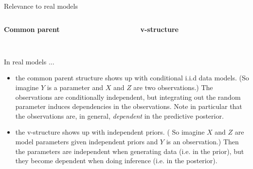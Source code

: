 \documentclass[10pt]{beamer}
\begin{document}
\begin{frame}{Relevance to real models}
\begin{columns}[onlytextwidth,t]
    
 \begin{column}{0.4\textwidth}
  \centering
    \textbf{Common parent} \\[.3cm]
		  \\[.3cm] 
    \end{column}
    
 \begin{column}{0.4\textwidth}
  \centering
    \textbf{v-structure} \\[.3cm]
		   \\[.3cm]
    \end{column}
    
\end{columns}

In real models ...
\begin{itemize}
\item the \alert{common parent structure} shows up with conditional i.i.d data models. \tiny (So imagine $Y$ is a parameter and $X$ and $Z$ are two observations.)  \normalsize    The observations are conditionally independent, but integrating out the random parameter induces dependencies in the observations.   Note in particular that the observations are, in general, \textit{dependent} in the predictive posterior. %
\item the \alert{v-structure} shows up with independent priors.   \tiny ( So imagine $X$ and $Z$ are  model parameters given independent priors and $Y$ is an observation.)  \normalsize  Then the parameters are independent when generating data (i.e. in the prior), but they become dependent when doing inference (i.e. in the posterior). 
\end{itemize}

\end{frame}
\end{document}
